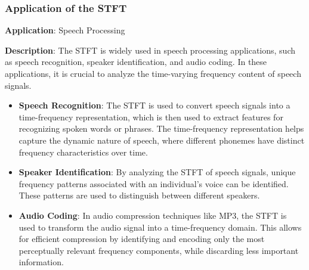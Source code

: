 \subsubsection*{Application of the STFT}

\textbf{Application}: Speech Processing

\textbf{Description}:
The STFT is widely used in speech processing applications, such as speech recognition, speaker identification, and audio coding. In these applications, it is crucial to analyze the time-varying frequency content of speech signals.

\begin{itemize}
    \item \textbf{Speech Recognition}: The STFT is used to convert speech signals into a time-frequency representation, which is then used to extract features for recognizing spoken words or phrases. The time-frequency representation helps capture the dynamic nature of speech, where different phonemes have distinct frequency characteristics over time.

    \item \textbf{Speaker Identification}: By analyzing the STFT of speech signals, unique frequency patterns associated with an individual's voice can be identified. These patterns are used to distinguish between different speakers.

    \item \textbf{Audio Coding}: In audio compression techniques like MP3, the STFT is used to transform the audio signal into a time-frequency domain. This allows for efficient compression by identifying and encoding only the most perceptually relevant frequency components, while discarding less important information.
\end{itemize}
